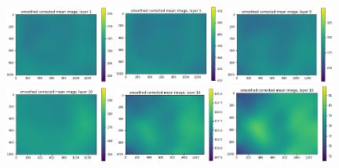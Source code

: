 \documentclass[letterpaper,11pt]{article}
\begin{document}
\begin{figure}[!ht]
\centering
\includegraphics[width=0.32\textwidth]{images/results/smoothed_corrected_mean_image_layers_vectra/smoothed_corrected_mean_image_layer_1_same_scale}
\includegraphics[width=0.32\textwidth]{images/results/smoothed_corrected_mean_image_layers_vectra/smoothed_corrected_mean_image_layer_5_same_scale}
\includegraphics[width=0.32\textwidth]{images/results/smoothed_corrected_mean_image_layers_vectra/smoothed_corrected_mean_image_layer_9_same_scale}
\includegraphics[width=0.32\textwidth]{images/results/smoothed_corrected_mean_image_layers_vectra/smoothed_corrected_mean_image_layer_10_same_scale}
\includegraphics[width=0.32\textwidth]{images/results/smoothed_corrected_mean_image_layers_vectra/smoothed_corrected_mean_image_layer_14_same_scale}
\includegraphics[width=0.32\textwidth]{images/results/smoothed_corrected_mean_image_layers_vectra/smoothed_corrected_mean_image_layer_18_same_scale}

\end{figure}
\end{document}
